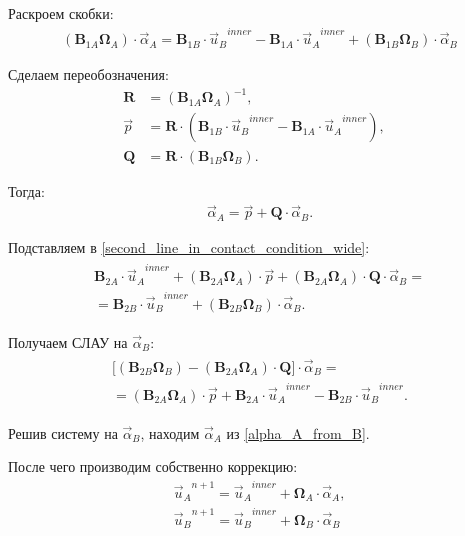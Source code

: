 Раскроем скобки:
\begin{eqnarray}
	(\mathbf{B}_{1A} \mathbf{\Omega}_A) \cdot  \vec{\alpha}_A = \mathbf{B}_{1B} \cdot {\vec{u}_B}^{inner} - \mathbf{B}_{1A} \cdot {\vec{u}_A}^{inner} + (\mathbf{B}_{1B} \mathbf{\Omega}_B) \cdot \vec{\alpha}_B
\end{eqnarray}

Сделаем переобозначения:
\begin{align}
\label{matrixRcontact}
\mathbf{R} &= (\mathbf{B}_{1A} \mathbf{\Omega}_A)^{-1}, &\\
\vec{p} &= \mathbf{R} \cdot (\mathbf{B}_{1B} \cdot {\vec{u}_B}^{inner} - \mathbf{B}_{1A} \cdot {\vec{u}_A}^{inner}), &\\
\mathbf{Q} &= \mathbf{R} \cdot (\mathbf{B}_{1B} \mathbf{\Omega}_B).
\end{align}

Тогда:
\begin{eqnarray}
\label{alpha_A_from_B}
\vec{\alpha}_A = \vec{p} + \mathbf{Q} \cdot \vec{\alpha}_B.
\end{eqnarray}

Подставляем в \eqref{second_line_in_contact_condition_wide}:
\begin{eqnarray}
\begin{split}
\mathbf{B}_{2A} \cdot {\vec{u}_A}^{inner} + (\mathbf{B}_{2A} \mathbf{\Omega}_A) \cdot \vec{p} + (\mathbf{B}_{2A} \mathbf{\Omega}_A) \cdot \mathbf{Q} \cdot \vec{\alpha}_B = \\ =
\mathbf{B}_{2B} \cdot {\vec{u}_B}^{inner} + (\mathbf{B}_{2B} \mathbf{\Omega}_B) \cdot \vec{\alpha}_B.
\end{split}
\end{eqnarray}

Получаем СЛАУ на $\vec{\alpha}_B$:
\begin{eqnarray}
\label{SLE_on_alphaB}
\begin{split}
\Bigg[  (\mathbf{B}_{2B} \mathbf{\Omega}_B) - (\mathbf{B}_{2A} \mathbf{\Omega}_A) \cdot \mathbf{Q}  \Bigg] \cdot \vec{\alpha}_B = \\ = 
(\mathbf{B}_{2A} \mathbf{\Omega}_A) \cdot \vec{p} + \mathbf{B}_{2A} \cdot {\vec{u}_A}^{inner} - \mathbf{B}_{2B} \cdot {\vec{u}_B}^{inner}.
\end{split}
\end{eqnarray}

Решив систему на $\vec{\alpha}_B$, находим $\vec{\alpha}_A$ из \eqref{alpha_A_from_B}.

После чего производим собственно коррекцию:
\begin{eqnarray}
{\vec{u}_A}^{n+1} = {\vec{u}_A}^{inner} + \mathbf{\Omega}_A \cdot \vec{\alpha}_A, \\
{\vec{u}_B}^{n+1} = {\vec{u}_B}^{inner} + \mathbf{\Omega}_B \cdot \vec{\alpha}_B
\end{eqnarray}

